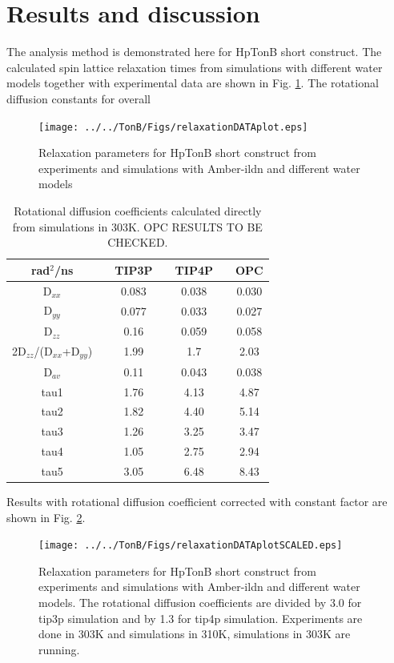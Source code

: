\documentclass[pre,aps,floatfix,authordate1-4,twocolumn]{revtex4-1}
\begin{document}
\section{Results and discussion}

The analysis method is demonstrated here for HpTonB short construct.
The calculated spin lattice relaxation times from simulations with different
water models together with experimental data \cite{??} are shown in Fig. \ref{relaxationDATAplot}.
The rotational diffusion constants for overall 

\begin{figure}[!h]
  \texttt{[image: ../../TonB/Figs/relaxationDATAplot.eps]}%
  \caption{Relaxation parameters for HpTonB short construct from
    experiments and simulations with Amber-ildn and different water models
    \label{relaxationDATAplot}}%
\end{figure}

\begin{table}[htb]
\centering
\caption{Rotational diffusion coefficients calculated directly from simulations in 303K.
  OPC RESULTS TO BE CHECKED.
}\label{ROTdiffCOEFFS}
\begin{tabular}{c c c c c c c }
  rad$^2$/ns   &    &  TIP3P  &   &   TIP4P   &  &   OPC \\
  \hline
  D$_{xx}$    &   &   0.083   &   &   0.038   &  &   0.030 \\
  D$_{yy}$   &    &  0.077   &    &   0.033   &  &   0.027 \\
  D$_{zz}$   &    &  0.16    &    &   0.059   &  &    0.058 \\
  2D$_{zz}$/(D$_{xx}$+D$_{yy}$) &  &   1.99    &  & 1.7    &	&  2.03 \\
  D$_{av}$  &    &   0.11    &    &   0.043   &  &   0.038 \\
  tau1     &  &  1.76	 &       &   4.13    &   &   4.87 \\
  tau2     &  &  1.82	 &       &   4.40    &   &   5.14 \\
  tau3     &  &  1.26	&        &   3.25    &   &   3.47 \\
  tau4     &  &  1.05	 &       &    2.75   &   &  2.94 \\
  tau5     &  &  3.05	 &       &    6.48   &   &   8.43 \\
  
\end{tabular}
\end{table} 

Results with rotational diffusion coefficient corrected with constant factor
are shown in Fig. \ref{relaxationDATAplotSCALED}. 
\begin{figure}[!h]
  \texttt{[image: ../../TonB/Figs/relaxationDATAplotSCALED.eps]}%
  \caption{Relaxation parameters for HpTonB short construct from
    experiments and simulations with Amber-ildn and different water models.
    The rotational diffusion coefficients are divided by 3.0 for tip3p simulation
    and by 1.3 for tip4p simulation.
    Experiments are done in 303K and simulations in 310K, simulations in 303K are running.
    \label{relaxationDATAplotSCALED}}%
\end{figure}
\end{document}
